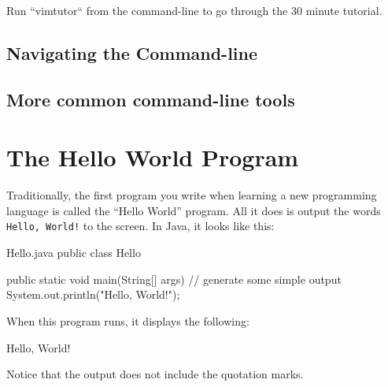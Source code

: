 Run ``vimtutor`` from the command-line to go through the 30 minute tutorial.

\label{subsec:navgCMNDLINE}
\subsection{Navigating the Command-line}

\subsection{More common command-line tools}
\label{subsec:cmndLine}

\section{The Hello World Program}
\label{hello}

Traditionally, the first program you write when learning a new programming language is called the ``Hello World'' program.
All it does is output the words {\tt Hello, World!} to the screen.
In Java, it looks like this:



\begin{trinket}[235]{Hello.java}
public class Hello {

    public static void main(String[] args) {
        // generate some simple output
        System.out.println("Hello, World!");
    }
}
\end{trinket}

When this program runs, it displays the following:

\begin{stdout}
Hello, World!
\end{stdout}

Notice that the output does not include the quotation marks.



